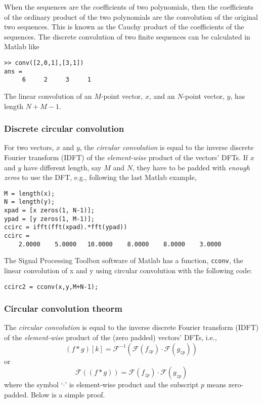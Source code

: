 \documentclass[11pt]{amsart}
\begin{document}
 When the sequences are the coefficients of two polynomials, then the coefficients of the ordinary product of the two polynomials are the convolution of the original two sequences. This is known as the Cauchy product of the coefficients of the sequences. The discrete convolution of two finite sequences can be calculated in Matlab like 
 \begin{lstlisting}
>> conv([2,0,1],[3,1])
ans =
     6     2     3     1
\end{lstlisting}
The linear convolution of an $M$-point vector, $x$, and an $N$-point vector, $y$, has length $N + M - 1$.

\subsubsection{Discrete circular convolution}
 For two vectors, $x$ and $y$, the \emph{circular convolution} is equal to the inverse discrete Fourier transform (IDFT) of the \emph{element-wise} product of the vectors' DFTs. If $x$ and $y$ have different length, say $M$ and $N$, they have to be padded with \emph{enough zeros} to use the DFT, e.g., following the last Matlab example,
\begin{lstlisting}
M = length(x);
N = length(y);
xpad = [x zeros(1, N-1)];
ypad = [y zeros(1, M-1)];
ccirc = ifft(fft(xpad).*fft(ypad))
ccirc =
    2.0000    5.0000   10.0000    8.0000    8.0000    3.0000
\end{lstlisting} 
The Signal Processing Toolbox software of Matlab has a function, \verb|cconv|,  the linear convolution of x and y using circular convolution with the following code:
\begin{lstlisting}
ccirc2 = cconv(x,y,M+N-1);
\end{lstlisting} 


\subsubsection{Circular convolution theorm}
The \emph{circular convolution} is equal to the inverse discrete Fourier transform (IDFT) of the \emph{element-wise} product of the (zero padded) vectors' DFTs, i.e.,
\begin{equation}
(f*g)[k] = \mathcal{F}^{-1}( \mathcal{F}(f_{zp})\cdot \mathcal{F}(g_{zp}))
\end{equation}
or
\begin{equation}
\mathcal{F}((f*g)) = \mathcal{F}(f_{zp})\cdot \mathcal{F}(g_{zp})
\end{equation}
where the symbol `$\cdot$' is element-wise product and the subscript $p$ means zero-padded. Below is a simple proof.
\end{document}

